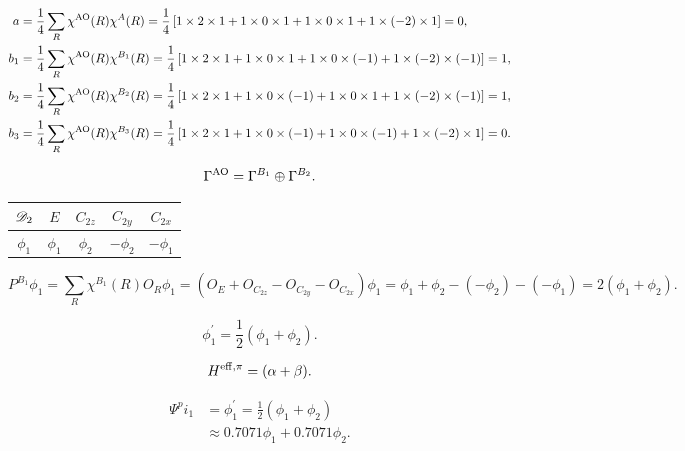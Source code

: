 \documentclass[a4paper]{book}
\newcommand{\AO}{{\rm AO}}
\newcommand{\Heff}{H^{\rm eff,\pi}}
\begin{document}
\begin{solution}
\begin{enumerate}[label=(\alph*)]
		\begin{align*}
		a &= \frac{1}{4} \sum_{R} \chi^{\AO}(R) \chi^{A}(R) = \frac{1}{4} \left[ 1 \times 2 \times 1 + 1 \times 0 \times 1 + 1 \times 0 \times 1 + 1 \times (-2) \times 1 \right] = 0, \\
		b_1	&= \frac{1}{4} \sum_{R} \chi^{\AO}(R) \chi^{B_1}(R) = \frac{1}{4} \left[ 1 \times 2 \times 1 + 1 \times 0 \times 1 + 1 \times 0 \times (-1) + 1 \times (-2) \times (-1) \right] = 1, \\
		b_2	&= \frac{1}{4} \sum_{R} \chi^{\AO}(R) \chi^{B_2}(R) = \frac{1}{4} \left[ 1 \times 2 \times 1 + 1 \times 0 \times (-1) + 1 \times 0 \times 1 + 1 \times (-2) \times (-1) \right] = 1, \\
		b_3	&= \frac{1}{4} \sum_{R} \chi^{\AO}(R) \chi^{B_3}(R) = \frac{1}{4} \left[ 1 \times 2 \times 1 + 1 \times 0 \times (-1) + 1 \times 0 \times (-1) + 1 \times (-2) \times 1 \right] = 0.
		\end{align*}
		
		\begin{equation*}
			\Gamma^{\AO} = \Gamma^{B_1} \oplus \Gamma^{B_2}.
		\end{equation*}
		
		\begin{center}
		\begin{tabular}{ccccc}\hline
	$\mathscr{D}_{\rm 2}$ & $E$ & $C_{2z}$ & $C_{2y}$ & $C_{2x}$ \\ \hline
			$\phi_1$	&	$\phi_1$	&	$\phi_2$	&	$-\phi_2$	&	$-\phi_1$	\\	\hline
		\end{tabular}
		\end{center}
		
		\begin{equation*}
		P^{B_1}\phi_1 = \sum_{R} \chi^{B_1}(R) O_R \phi_1 = (O_E + O_{C_{2z}} - O_{C_{2y}} - O_{C_{2x}})\phi_1 = \phi_1 +\phi_2 - (-\phi_2) - (-\phi_1) = 2(\phi_1 + \phi_2) .
		\end{equation*}
		
		\begin{equation*}
		\phi^\prime_1 = \frac{1}{2}(\phi_1 + \phi_2) .
		\end{equation*}
		
		\begin{equation*}
			\Heff = ( \alpha + \beta ).
		\end{equation*}
		
		\begin{align}
			\Psi^pi_1 &= \phi^\prime_1 = \frac{1}{2}(\phi_1 + \phi_2) \\
			&\approx 0.7071 \phi_1 + 0.7071 \phi_2.
		\end{align}
		

\end{enumerate}
\end{solution}
\end{document}
